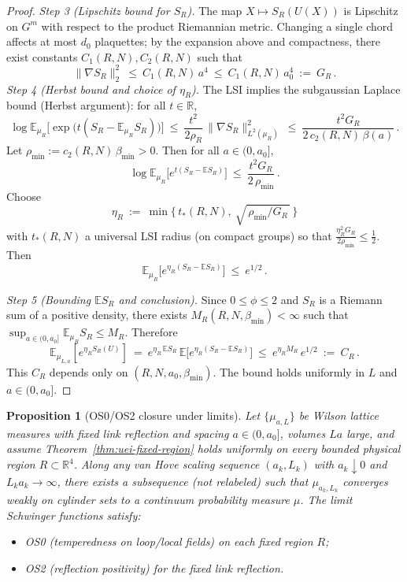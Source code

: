 \documentclass[11pt]{amsart}
\theoremstyle{plain}
\newtheorem{proposition}[theorem]{Proposition}
\theoremstyle{definition}
\theoremstyle{remark}
\renewcommand{\tfrac}[2]{\textstyle\frac{#1}{#2}}
\begin{document}
\begin{proof}
\emph{Step 3 (Lipschitz bound for $S_R$).} The map $X\mapsto S_R(U(X))$ is Lipschitz on $G^{m}$ with respect to the product Riemannian metric. Changing a single chord affects at most $d_0$ plaquettes; by the expansion above and compactness, there exist constants $C_1(R,N),C_2(R,N)$ such that
\[
  \|\nabla S_R\|_2^2\ \le\ C_1(R,N)\,a^4\ \le\ C_1(R,N)\,a_0^4\ :=\ G_R\,.
\]
\emph{Step 4 (Herbst bound and choice of $\eta_R$).} The LSI implies the subgaussian Laplace bound (Herbst argument): for all $t\in\mathbb{R}$,
\[
  \log\mathbb{E}_{\mu_R}\big[\exp\big(t(S_R-\mathbb{E}_{\mu_R}S_R)\big)\big]
  \ \le\ \frac{t^2}{2\rho_R}\,\|\nabla S_R\|_{L^2(\mu_R)}^2
  \ \le\ \frac{t^2 G_R}{2\,c_2(R,N)\,\beta(a)}\,.
\]
Let $\rho_{\min}:=c_2(R,N)\,\beta_{\min}>0$. Then for all $a\in(0,a_0]$,
\[
  \log\mathbb{E}_{\mu_R}\big[e^{t(S_R-\mathbb{E}S_R)}\big]\ \le\ \frac{t^2 G_R}{2\,\rho_{\min}}\,.
\]
Choose
\[
  \eta_R\ :=\ \min\Big\{\,t_*(R,N),\ \sqrt{\,\rho_{\min}/G_R\,}\,\Big\}
\]
with $t_*(R,N)$ a universal LSI radius (on compact groups) so that $\frac{\eta_R^2 G_R}{2\rho_{\min}}\le \tfrac12$. Then
\[
  \mathbb{E}_{\mu_R}\big[e^{\eta_R(S_R-\mathbb{E}S_R)}\big]\ \le\ e^{1/2}\,.
\]

\emph{Step 5 (Bounding $\mathbb{E}S_R$ and conclusion).} Since $0\le\phi\le 2$ and $S_R$ is a Riemann sum of a positive density, there exists $M_R(R,N,\beta_{\min})<\infty$ such that $\sup_{a\in(0,a_0]}\mathbb{E}_{\mu_R}S_R\le M_R$. Therefore
\[
  \mathbb{E}_{\mu_{L,a}}\!\left[e^{\eta_R S_R(U)}\right]
  \ =\ e^{\eta_R\,\mathbb{E}S_R}\,\mathbb{E}\big[e^{\eta_R(S_R-\mathbb{E}S_R)}\big]
  \ \le\ e^{\eta_R M_R}\,e^{1/2}
  \ :=\ C_R\,.
\]
This $C_R$ depends only on $(R,N,a_0,\beta_{\min})$. The bound holds uniformly in $L$ and $a\in(0,a_0]$.
\end{proof}
\medskip
\begin{proposition}[OS0/OS2 closure under limits]\label{prop:os0os2-closure}
Let $\{\mu_{a,L}\}$ be Wilson lattice measures with fixed link reflection and spacing $a\in(0,a_0]$, volumes $L a$ large, and assume Theorem~\ref{thm:uei-fixed-region} holds uniformly on every bounded physical region $R\subset\mathbb R^4$. Along any van Hove scaling sequence $(a_k,L_k)$ with $a_k\downarrow 0$ and $L_k a_k\to\infty$, there exists a subsequence (not relabeled) such that $\mu_{a_k,L_k}$ converges weakly on cylinder sets to a continuum probability measure $\mu$. The limit Schwinger functions satisfy:
\begin{itemize}
  \item OS0 (temperedness on loop/local fields) on each fixed region $R$;
  \item OS2 (reflection positivity) for the fixed link reflection.
\end{itemize}
\end{proposition}
\end{document}
